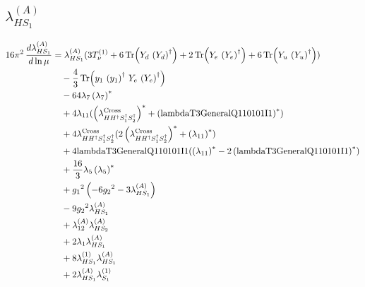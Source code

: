\documentclass[10pt,a4paper]{article}
\begin{document}
\subsection*{$\lambda_{HS_1}^{(A)}$}
\begin{align*}
16\pi^2\,\frac{d \lambda_{HS_1}^{(A)}}{d\ln\mu} &={\lambda_{HS_1}^{(A)}} (3 T_{\nu}^{(1)}+6 \operatorname{Tr}\!\left({Y_d}\,\left({Y_d}\right)^{\dagger}\right)+2 \operatorname{Tr}\!\left({Y_e}\,\left({Y_e}\right)^{\dagger}\right)+6 \operatorname{Tr}\!\left({Y_u}\,\left({Y_u}\right)^{\dagger}\right)) \\
&\quad -\frac{4}{3} \operatorname{Tr}\!\left({y_1}\,\left({y_1}\right)^{\dagger}\,{Y_e}\,\left({Y_e}\right)^{\dagger}\right) \\
&\quad -64 {\lambda_{7}} \left({\lambda_{7}}\right)^{*} \\
&\quad +4 {\lambda_{11}} (\left({\lambda_{H H^\dagger S_1^\dagger S_2^\dagger}^{\rm Cross}}\right)^{*}+\left(\text{lambdaT3GeneralQ110101I1}\right)^{*}) \\
&\quad +4 {\lambda_{H H^\dagger S_1^\dagger S_2^\dagger}^{\rm Cross}} (2 \left({\lambda_{H H^\dagger S_1^\dagger S_2^\dagger}^{\rm Cross}}\right)^{*}+\left({\lambda_{11}}\right)^{*}) \\
&\quad +4 \text{lambdaT3GeneralQ110101I1} (\left({\lambda_{11}}\right)^{*}-2 \left(\text{lambdaT3GeneralQ110101I1}\right)^{*}) \\
&\quad +\frac{16}{3} {\lambda_5} \left({\lambda_5}\right)^{*} \\
&\quad +{g_1}^2 \left(-6 {g_2}^2-3 {\lambda_{HS_1}^{(A)}}\right) \\
&\quad -9 {g_2}^2 {\lambda_{HS_1}^{(A)}} \\
&\quad +{\lambda_{12}^{(A)}} {\lambda_{HS_2}^{(A)}} \\
&\quad +2 {\lambda_1} {\lambda_{HS_1}^{(A)}} \\
&\quad +8 {\lambda_{HS_1}^{(1)}} {\lambda_{HS_1}^{(A)}} \\
&\quad +2 {\lambda_{HS_1}^{(A)}} {\lambda_{S_1}^{(1)}} \\
\end{align*}
\end{document}
